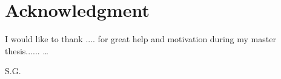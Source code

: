 \chapter*{Acknowledgment}
I would like to thank .... for great help and motivation during my master thesis...... \ldots



\begin{flushright}
S.G.\\[1pc]

\end{flushright}